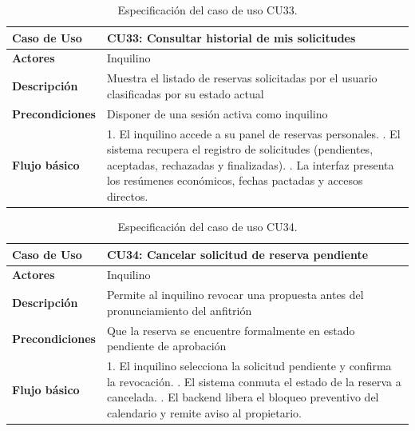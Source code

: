\begin{table}[H]
\centering
\begin{tabular}{|p{3.2cm}|p{11.3cm}|}
\hline
\textbf{Caso de Uso} & \textbf{CU33: Consultar historial de mis solicitudes} \\ \hline
\textbf{Actores} & Inquilino \\ \hline
\textbf{Descripción} & Muestra el listado de reservas solicitadas por el usuario clasificadas por su estado actual \\ \hline
\textbf{Precondiciones} & Disponer de una sesión activa como inquilino \\ \hline
\textbf{Flujo básico} & 
1. El inquilino accede a su panel de reservas personales. \newline
2. El sistema recupera el registro de solicitudes (pendientes, aceptadas, rechazadas y finalizadas). \newline
3. La interfaz presenta los resúmenes económicos, fechas pactadas y accesos directos. \\ \hline
\end{tabular}
\caption{Especificación del caso de uso CU33.}
\label{tab:cu33}
\end{table}

\begin{table}[H]
\centering
\begin{tabular}{|p{3.2cm}|p{11.3cm}|}
\hline
\textbf{Caso de Uso} & \textbf{CU34: Cancelar solicitud de reserva pendiente} \\ \hline
\textbf{Actores} & Inquilino \\ \hline
\textbf{Descripción} & Permite al inquilino revocar una propuesta antes del pronunciamiento del anfitrión \\ \hline
\textbf{Precondiciones} & Que la reserva se encuentre formalmente en estado pendiente de aprobación \\ \hline
\textbf{Flujo básico} & 
1. El inquilino selecciona la solicitud pendiente y confirma la revocación. \newline
2. El sistema conmuta el estado de la reserva a cancelada. \newline
3. El backend libera el bloqueo preventivo del calendario y remite aviso al propietario. \\ \hline
\end{tabular}
\caption{Especificación del caso de uso CU34.}
\label{tab:cu34}
\end{table}

